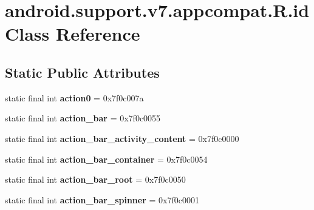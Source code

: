 \hypertarget{classandroid_1_1support_1_1v7_1_1appcompat_1_1_r_1_1id}{}\section{android.\+support.\+v7.\+appcompat.\+R.\+id Class Reference}
\label{classandroid_1_1support_1_1v7_1_1appcompat_1_1_r_1_1id}
\subsection*{Static Public Attributes}
\begin{DoxyCompactItemize}
\item 
\hypertarget{classandroid_1_1support_1_1v7_1_1appcompat_1_1_r_1_1id_a2c658ecf3cb7a212407850bf58715caa}{}static final int {\bfseries action0} = 0x7f0c007a\label{classandroid_1_1support_1_1v7_1_1appcompat_1_1_r_1_1id_a2c658ecf3cb7a212407850bf58715caa}

\item 
\hypertarget{classandroid_1_1support_1_1v7_1_1appcompat_1_1_r_1_1id_a6c9c8b18c3b57617cf60a9b1ad51f2f1}{}static final int {\bfseries action\+\_\+bar} = 0x7f0c0055\label{classandroid_1_1support_1_1v7_1_1appcompat_1_1_r_1_1id_a6c9c8b18c3b57617cf60a9b1ad51f2f1}

\item 
\hypertarget{classandroid_1_1support_1_1v7_1_1appcompat_1_1_r_1_1id_a9ed5ea10a253071eaefa58062f541097}{}static final int {\bfseries action\+\_\+bar\+\_\+activity\+\_\+content} = 0x7f0c0000\label{classandroid_1_1support_1_1v7_1_1appcompat_1_1_r_1_1id_a9ed5ea10a253071eaefa58062f541097}

\item 
\hypertarget{classandroid_1_1support_1_1v7_1_1appcompat_1_1_r_1_1id_a4e19d90e373b2bdb18641e8820c0d7a3}{}static final int {\bfseries action\+\_\+bar\+\_\+container} = 0x7f0c0054\label{classandroid_1_1support_1_1v7_1_1appcompat_1_1_r_1_1id_a4e19d90e373b2bdb18641e8820c0d7a3}

\item 
\hypertarget{classandroid_1_1support_1_1v7_1_1appcompat_1_1_r_1_1id_afbd1bfdb4a6c3f4fe61c7d6f8d0b6f45}{}static final int {\bfseries action\+\_\+bar\+\_\+root} = 0x7f0c0050\label{classandroid_1_1support_1_1v7_1_1appcompat_1_1_r_1_1id_afbd1bfdb4a6c3f4fe61c7d6f8d0b6f45}

\item 
\hypertarget{classandroid_1_1support_1_1v7_1_1appcompat_1_1_r_1_1id_ae703f67eed43afe20bafdd104fc16078}{}static final int {\bfseries action\+\_\+bar\+\_\+spinner} = 0x7f0c0001\label{classandroid_1_1support_1_1v7_1_1appcompat_1_1_r_1_1id_ae703f67eed43afe20bafdd104fc16078}


\end{DoxyCompactItemize}
